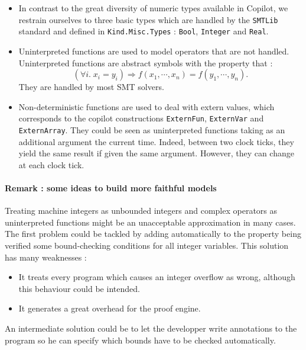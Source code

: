 \begin{itemize}
\item In contrast to the great diversity of numeric types available in Copilot, we restrain ourselves to three basic types which are handled by the \texttt{SMTLib} standard and defined in \texttt{Kind.Misc.Types} : \texttt{Bool}, \texttt{Integer} and \texttt{Real}.


\item Uninterpreted functions are used to model operators that are not handled. Uninterpreted functions are abstract symbols with the property that : $$ \left( \forall i . \; x_i = y_i \right) \Longrightarrow f(x_1, \cdots, x_n) = f(y_1, \cdots, y_n). $$ They are handled by most SMT solvers.

\item Non-deterministic functions are used to deal with extern values, which corresponds to the copilot constructions \texttt{ExternFun}, \texttt{ExternVar} and \texttt{ExternArray}. They could be seen as uninterpreted functions taking as an additional argument the current time. Indeed, between two clock ticks, they yield the same result if given the same argument. However, they can change at each clock tick.

\end{itemize}


\paragraph{Remark : some ideas to build more faithful models}

Treating machine integers as unbounded integers and complex operators as uninterpreted functions might be an unacceptable approximation in many cases. The first problem could be tackled by adding automatically to the property being verified some bound-checking conditions for all integer variables. This solution has many weaknesses :

\begin{itemize}
\item It treats every program which causes an integer overflow as wrong, although this behaviour could be intended.
\item It generates a great overhead for the proof engine.
\end{itemize}

An intermediate solution could be to let the developper write annotations to the program so he can specify which bounds have to be checked automatically.



